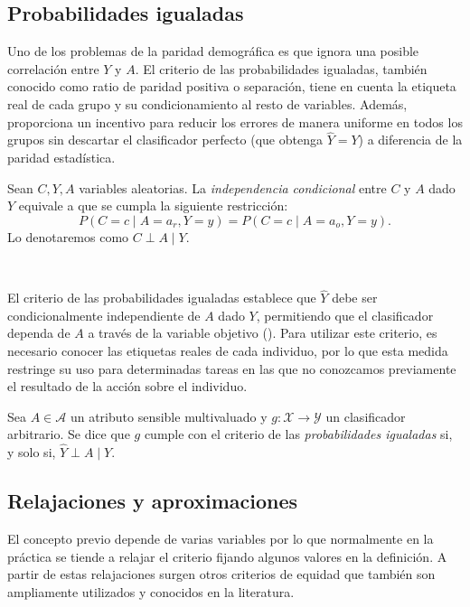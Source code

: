 \documentclass[oneside,openright,titlepage,numbers=noenddot,openany,headinclude,footinclude=true,
cleardoublepage=empty,abstractoff,BCOR=5mm,paper=a4,fontsize=12pt,main=spanish]{scrreprt}
\begin{document}
\subsection{Probabilidades igualadas}

Uno de los problemas de la paridad demográfica es que ignora una posible correlación entre $Y$ y $A$. El criterio de las probabilidades igualadas, también conocido como ratio de paridad positiva o separación, tiene en cuenta la etiqueta real de cada grupo y su condicionamiento al resto de variables. Además, proporciona un incentivo para reducir los errores de manera uniforme en todos los grupos sin descartar el clasificador perfecto (que obtenga $\hat{Y}=Y$) a diferencia de la paridad estadística.\\

\begin{definition}
Sean $C,Y,A$ variables aleatorias. La \textit{independencia condicional} entre $C$ y $A$ dado $Y$ equivale a que se cumpla la siguiente restricción:
$$P(C=c \mid A=a_r, Y=y)=P(C=c \mid A=a_o,Y=y).$$
Lo denotaremos como $C \perp A \mid Y.$
\end{definition}\

El criterio de las probabilidades igualadas establece que $\hat{Y}$ debe ser condicionalmente independiente de $A$ dado $Y$, permitiendo que el clasificador dependa de $A$ a través de la variable objetivo (\cite{eodd2016}). Para utilizar este criterio, es necesario conocer las etiquetas reales de cada individuo, por lo que esta medida restringe su uso para determinadas tareas en las que no conozcamos previamente el resultado de la acción sobre el individuo.\\

\begin{definition} \label{def:probigual}
Sea $A \in \mathcal{A}$ un atributo sensible multivaluado y $g\colon \mathcal{X} \to \mathcal{Y}$ un clasificador arbitrario. Se dice que $g$ cumple con el criterio de las \textit{probabilidades igualadas} si, y solo si, $\hat{Y} \perp A \mid Y$.
\end{definition}

\subsection*{Relajaciones y aproximaciones}

El concepto previo depende de varias variables por lo que normalmente en la práctica se tiende a relajar el criterio fijando algunos valores en la definición. A partir de estas relajaciones surgen otros criterios de equidad que también son ampliamente utilizados y conocidos en la literatura.
\end{document}
